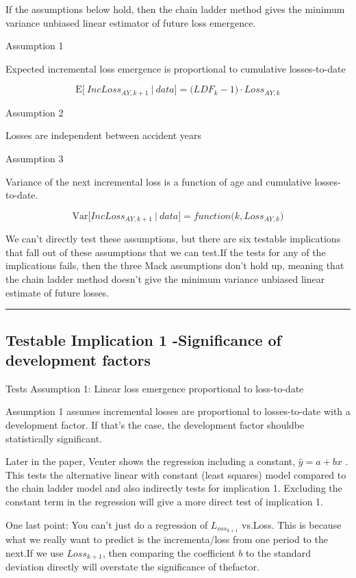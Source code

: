 \documentclass[
]{article}
\begin{document}
If the assumptions below hold, then the chain ladder method gives the
minimum variance unbiased linear estimator of future loss emergence.

Assumption 1

Expected incremental loss emergence is proportional to cumulative
losses-to-date

\[\mathrm{E}\Big[\:IncLoss_{AY,k+1}\:|\:data\Big]=\Big(LDF_{k}-1\Big)\cdot Loss_{AY,k}\]

Assumption 2

Losses are independent between accident years

Assumption 3

Variance of the next incremental loss is a function of age and
cumulative losses-to-date.

\[\mathrm{Var}\Big[IncLoss_{AY,k+1}\:|\:data\Big]=function\Big(k,Loss_{AY,k}\Big)\]

We can't directly test these assumptions, but there are six testable
implications that fall out of these assumptions that we can test.If the
tests for any of the implications fails, then the three Mack assumptions
don't hold up, meaning that the chain ladder method doesn't give the
minimum variance unbiased linear estimate of future losses.

\begin{center}\rule{0.5\linewidth}{0.5pt}\end{center}

\subsection{Testable Implication 1 -Significance of development
factors}\label{testable-implication-1--significance-of-development-factors}

Tests Assumption 1: Linear loss emergence proportional to loss-to-date

Assumption 1 assumes incremental losses are proportional to
losses-to-date with a development factor. If that's the case, the
development factor shouldbe statistically significant.

Later in the paper, Venter shows the regression including a constant,
\(\hat{y} = a+ bx\) . This tests the alternative linear with constant
(least squares) model compared to the chain ladder model and also
indirectly tests for implication 1. Excluding the constant term in the
regression will give a more direct test of implication 1.

One last point: You can't just do a regression of \(L_{oss_{k+1}}\)
vs.Loss. This is because what we really want to predict is the
incrementa/loss from one period to the next.If we use \(Loss_{k+1}\),
then comparing the coefficient \(b\) to the standard deviation directly
will overstate the significance of thefactor.
\end{document}

